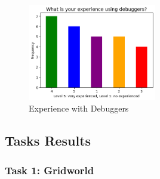\begin{figure}[H]
    \centering
    \includegraphics[width=0.5\textwidth]{figures/experience-debuggers.png}
    \caption{Experience with Debuggers}
    \label{fig:exp-deb}
\end{figure}


\subsection{Tasks Results}

\subsubsection{Task 1: Gridworld}

